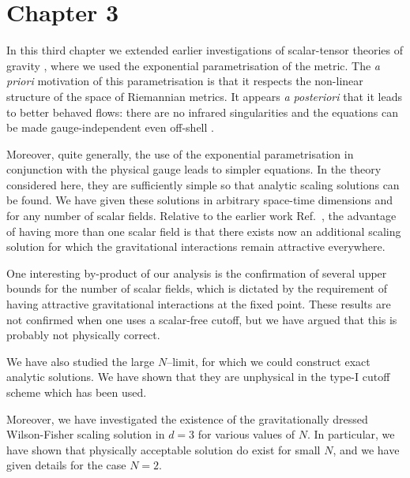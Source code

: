 \documentclass[11pt]{book}
\numberwithin{equation}{chapter}
\begin{document}
\section*{Chapter 3}

In this third chapter we extended earlier investigations of scalar-tensor
theories of gravity \cite{Percacci:2015wwa},
where we used the exponential parametrisation of the metric.
The {\it a priori} motivation of this parametrisation is that
it respects the non-linear structure of the space of Riemannian metrics.
It appears {\it a posteriori} that it leads to better behaved flows:
there are no infrared singularities \cite{Percacci:2015wwa,Falls:2015qga}
and the equations can be made gauge-independent even off-shell
\cite{Falls:2015qga}.

Moreover, quite generally, the use of the exponential parametrisation
in conjunction with the physical gauge leads to simpler equations.
In the theory considered here, they are sufficiently simple
so that analytic scaling solutions can be found.
We have given these solutions in arbitrary
space-time dimensions and for any number of scalar fields.
Relative to the earlier work Ref.~\cite{Percacci:2015wwa},
the advantage of having more than
one scalar field is that there exists now an additional
scaling solution for which the gravitational interactions
remain attractive everywhere.

One interesting by-product of our analysis is the confirmation
of several upper bounds for the number of scalar fields,
which is dictated by the requirement of having attractive
gravitational interactions at the fixed point.
These results are not confirmed when one uses a scalar-free cutoff,
but we have argued that this is probably not physically correct.

We have also studied the large $N$--limit, for which we could
construct exact analytic solutions.
We have shown that they are unphysical in the type-I cutoff scheme
which has been used.

Moreover, we have investigated the existence of the gravitationally
dressed Wilson-Fisher scaling solution in $d=3$ for various values of $N$.
In particular, we have shown that physically acceptable solution do exist
for small $N$, and we have given details for the case $N=2$.

\end{document}
